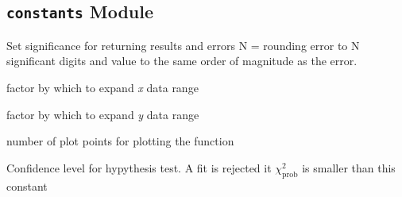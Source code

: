 \documentclass[a4paper,10pt,english]{sphinxmanual}
\begin{document}
\subsection{\texttt{constants} Module}
\label{index:constants-module}\label{index:module-kafe.constants}\label{index:module-constants}

\begin{fulllineitems}
\label{index:kafe.constants.F_SIGNIFICANCE}
Set significance for returning results and errors
N = rounding error to N significant digits and value
to the same order of magnitude as the error.

\end{fulllineitems}


\begin{fulllineitems}
\label{index:kafe.constants.G_PADDING_FACTOR_X}
factor by which to expand \emph{x} data range

\end{fulllineitems}


\begin{fulllineitems}
\label{index:kafe.constants.G_PADDING_FACTOR_Y}
factor by which to expand \emph{y} data range

\end{fulllineitems}


\begin{fulllineitems}
\label{index:kafe.constants.G_PLOT_POINTS}
number of plot points for plotting the function

\end{fulllineitems}


\begin{fulllineitems}
\label{index:kafe.constants.M_CONFIDENCE_LEVEL}
Confidence level for hypythesis test. A fit is rejected it $\chi^2_\text{prob}$ is smaller than this constant

\end{fulllineitems}
\end{document}
